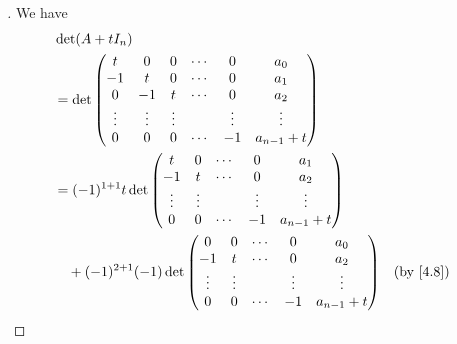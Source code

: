 \begin{proof}[]
  We have
  \begin{align*}
     & \det(A + t I_n)                                                                                                                \\
     & = \det\begin{pmatrix}
               t      & 0      & 0      & \cdots & 0      & a_0           \\
               -1     & t      & 0      & \cdots & 0      & a_1           \\
               0      & -1     & t      & \cdots & 0      & a_2           \\
               \vdots & \vdots & \vdots &        & \vdots & \vdots        \\
               0      & 0      & 0      & \cdots & -1     & a_{n - 1} + t
             \end{pmatrix}                                                               \\
     & = (-1)^{1 + 1} t \det\begin{pmatrix}
                              t      & 0      & \cdots & 0      & a_1           \\
                              -1     & t      & \cdots & 0      & a_2           \\
                              \vdots & \vdots &        & \vdots & \vdots        \\
                              0      & 0      & \cdots & -1     & a_{n - 1} + t
                            \end{pmatrix}                                                         \\
     & \quad + (-1)^{2 + 1} (-1) \det\begin{pmatrix}
                                       0      & 0      & \cdots & 0      & a_0           \\
                                       -1     & t      & \cdots & 0      & a_2           \\
                                       \vdots & \vdots &        & \vdots & \vdots        \\
                                       0      & 0      & \cdots & -1     & a_{n - 1} + t
                                     \end{pmatrix}                                            &  & \by{4.8}                           \\

\end{align*}
\end{proof}
